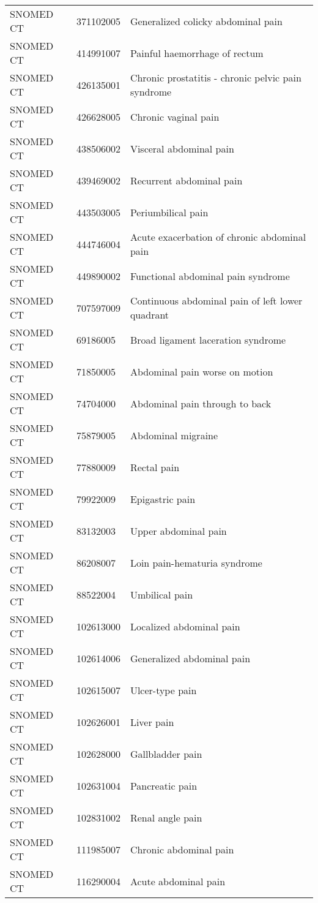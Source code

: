 \begin{longtable}{p{}p{}p{}}
  SNOMED CT & 371102005 & Generalized colicky abdominal pain \\ 
  SNOMED CT & 414991007 & Painful haemorrhage of rectum \\ 
  SNOMED CT & 426135001 & Chronic prostatitis - chronic pelvic pain syndrome \\ 
  SNOMED CT & 426628005 & Chronic vaginal pain \\ 
  SNOMED CT & 438506002 & Visceral abdominal pain \\ 
  SNOMED CT & 439469002 & Recurrent abdominal pain \\ 
  SNOMED CT & 443503005 & Periumbilical pain \\ 
  SNOMED CT & 444746004 & Acute exacerbation of chronic abdominal pain \\ 
  SNOMED CT & 449890002 & Functional abdominal pain syndrome \\ 
  SNOMED CT & 707597009 & Continuous abdominal pain of left lower quadrant \\ 
  SNOMED CT & 69186005 & Broad ligament laceration syndrome \\ 
  SNOMED CT & 71850005 & Abdominal pain worse on motion \\ 
  SNOMED CT & 74704000 & Abdominal pain through to back \\ 
  SNOMED CT & 75879005 & Abdominal migraine \\ 
  SNOMED CT & 77880009 & Rectal pain \\ 
  SNOMED CT & 79922009 & Epigastric pain \\ 
  SNOMED CT & 83132003 & Upper abdominal pain \\ 
  SNOMED CT & 86208007 & Loin pain-hematuria syndrome \\ 
  SNOMED CT & 88522004 & Umbilical pain \\ 
  SNOMED CT & 102613000 & Localized abdominal pain \\ 
  SNOMED CT & 102614006 & Generalized abdominal pain \\ 
  SNOMED CT & 102615007 & Ulcer-type pain \\ 
  SNOMED CT & 102626001 & Liver pain \\ 
  SNOMED CT & 102628000 & Gallbladder pain \\ 
  SNOMED CT & 102631004 & Pancreatic pain \\ 
  SNOMED CT & 102831002 & Renal angle pain \\ 
  SNOMED CT & 111985007 & Chronic abdominal pain \\ 
  SNOMED CT & 116290004 & Acute abdominal pain \\ 

\end{longtable}
